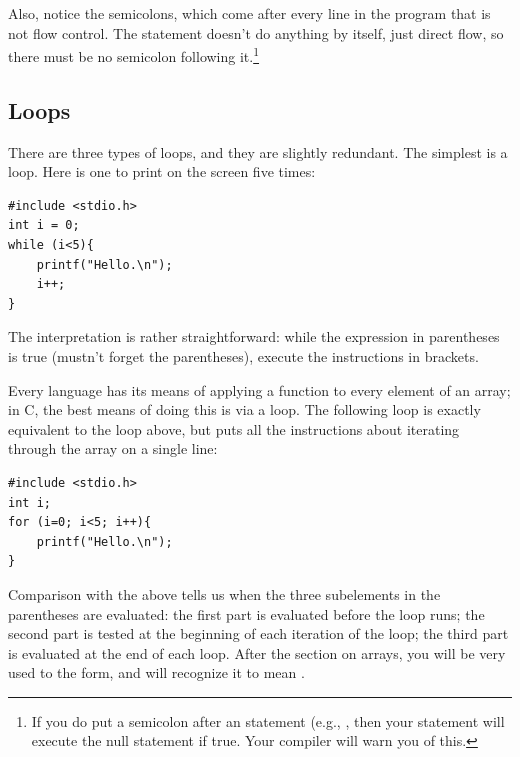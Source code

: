 Also, notice the semicolons, which come after every line in the program that is not flow control. The  statement doesn't do anything by itself, just direct flow, so there must be no semicolon following
it.\footnote{If you do put a semicolon after an  statement
(e.g., , then your  statement will
execute the null statement  if true. Your
compiler will warn you of this.}


\subsection{Loops} There are three types of loops, and they are slightly
redundant. The simplest is a  loop. Here is one to print 
on the screen five times: 

 
\begin{lstlisting}
#include <stdio.h>
int i = 0;
while (i<5){
    printf("Hello.\n");
    i++;
}
\end{lstlisting}

The interpretation is rather straightforward: while the expression
in parentheses is true (mustn't forget the parentheses), execute the
instructions in brackets.

Every language has its means of applying a function to every element of
an array; in C, the best means of doing this is via a  loop.
The following  loop is exactly equivalent to the 
loop above, but puts all the instructions about iterating through the
array on a single line:

\begin{lstlisting}
#include <stdio.h>
int i;
for (i=0; i<5; i++){
    printf("Hello.\n");
}
\end{lstlisting}

Comparison with the above tells us when the three subelements in the
parentheses are evaluated: the first part is evaluated before the
loop runs; the second part is tested at the beginning of each
iteration of the loop; the third part is evaluated at the end of each
loop. After the section on arrays, you will be very used to the 
 form, and will recognize it to mean .

